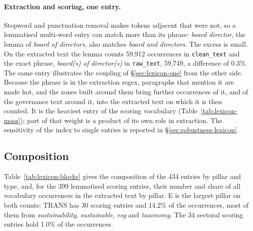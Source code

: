 \paragraph{Extraction and scoring, one entry.} Stopword and punctuation
removal makes tokens adjacent that were not, so a lemmatised multi-word entry
can match more than its phrase: \emph{board director}, the lemma of
\emph{board of directors}, also matches \emph{board and directors}. The excess
is small. On the extracted text the lemma counts 59,912 occurrences in
\texttt{clean\_text} and the exact phrase, \emph{board(s) of director(s)} in
\texttt{raw\_text}, 59,749, a difference of 0.3\%. The same entry illustrates
the coupling of \S\ref{sec:lexicon-one} from the other side. Because the phrase
is in the extraction regex, paragraphs that mention it are made hot, and the
zones built around them bring further occurrences of it, and of the governance
text around it, into the extracted text on which it is then counted. It is the
heaviest entry of the scoring vocabulary (Table~\ref{tab:lexicon-mass}); part
of that weight is a product of its own role in extraction. The sensitivity
of the index to single entries is reported in \S\ref{sec:robustness-lexicon}.

\subsection{Composition}
\label{sec:lexicon-composition}

Table~\ref{tab:lexicon-blocks} gives the composition of the 434 entries by
pillar and type, and, for the 399 lemmatised scoring entries, their number and
share of all vocabulary occurrences in the extracted text by pillar. E is the
largest pillar on both counts; TRANS has 30 scoring entries and 14.2\% of the
occurrences, most of them from \emph{sustainability}, \emph{sustainable},
\emph{esg} and \emph{taxonomy}. The 34 sectoral scoring entries hold 1.0\% of
the occurrences.

